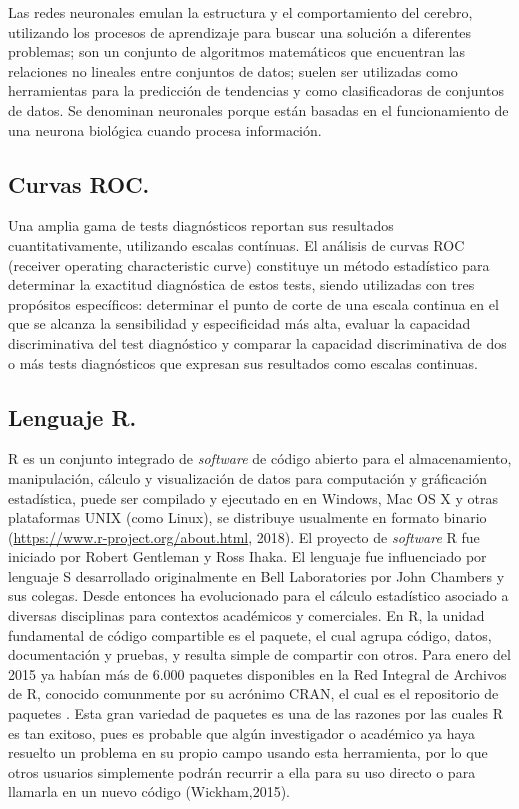 Las redes neuronales emulan la estructura y el comportamiento del cerebro, utilizando los procesos de aprendizaje para buscar una solución a diferentes problemas; son un conjunto de algoritmos matemáticos que encuentran las relaciones no lineales entre conjuntos de datos; suelen ser utilizadas como herramientas para la predicción de tendencias y como clasificadoras de conjuntos de datos. Se denominan neuronales porque están basadas en el funcionamiento de una neurona biológica cuando procesa información.

\subsection{Curvas ROC.}

Una amplia gama de tests diagnósticos reportan sus resultados cuantitativamente, utilizando escalas contínuas. El análisis de curvas ROC (receiver operating characteristic curve) constituye un método estadístico para determinar la exactitud diagnóstica de estos tests, siendo utilizadas con tres propósitos específicos: determinar el punto de corte de una escala continua en el que se alcanza la sensibilidad y especificidad más alta, evaluar la capacidad discriminativa del test diagnóstico y comparar la capacidad discriminativa de dos o más tests diagnósticos que expresan sus resultados como escalas continuas.

\subsection{Lenguaje R.}

R es un conjunto  integrado de \textit{software} de código abierto para el almacenamiento, manipulación, cálculo y visualización de datos para computación y gráficación estadística, puede ser compilado y ejecutado en  en Windows, Mac OS X y otras  plataformas UNIX (como Linux), se distribuye usualmente en formato binario (\url{https://www.r-project.org/about.html}, 2018). El proyecto de \emph{software} R fue iniciado por Robert Gentleman y Ross Ihaka. El lenguaje fue influenciado por  lenguaje S desarrollado originalmente en Bell Laboratories por John Chambers y sus colegas. Desde entonces ha evolucionado  para el cálculo estadístico asociado a diversas disciplinas para contextos académicos y comerciales. En R, la unidad fundamental de código compartible es el paquete, el cual agrupa código, datos, documentación y pruebas, y resulta simple de compartir con otros. Para enero del 2015 ya habían más de 6.000 paquetes disponibles en la Red Integral de Archivos de R, conocido comunmente por su acrónimo CRAN, el cual es el repositorio de paquetes . Esta gran variedad de paquetes es una de las razones por las cuales R es tan exitoso, pues es probable que algún investigador o académico ya haya resuelto un problema en su propio campo usando esta herramienta, por lo que otros usuarios simplemente podrán recurrir a ella para su uso directo o para llamarla en un nuevo código (Wickham,2015). \\

